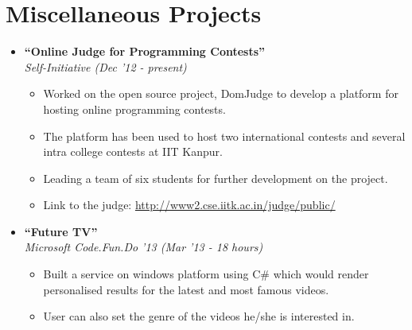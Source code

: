\documentclass[margin,line]{resume}
\begin{document}
\begin{resume}
\begin{itemize}
  \end{itemize}

  \section{\mysidestyle Miscellaneous Projects}
  \begin{itemize}
  \item \large{\textbf{\textsf{``Online Judge for Programming Contests''}}}
    \\ \small{\textit{Self-Initiative (Dec '12 - present)}}
    \normalsize
    \begin{itemize}
    \item Worked on the open source project, DomJudge to develop a platform for hosting online programming contests.
    \item The platform has been used to host two international contests and several intra college contests at IIT Kanpur.
    \item Leading a team of six students for further development on the project.
    \item Link to the judge: \url{http://www2.cse.iitk.ac.in/judge/public/}
    \end{itemize}

  \item \large{\textbf{\textsf{``Future TV''}}}
    \\ \small{\textit{Microsoft Code.Fun.Do '13 (Mar '13 - 18 hours)}}
    \normalsize
    \begin{itemize}
    \item Built a service on windows platform using C\# which would render personalised results for the latest and most famous videos.
    \item User can also set the genre of the videos he/she is interested in.
    \end{itemize}


\end{itemize}
\end{resume}
\end{document}
